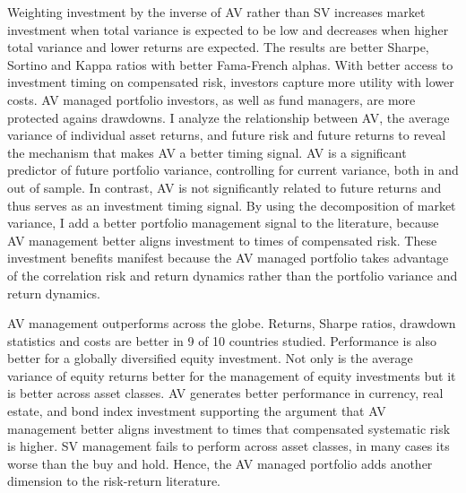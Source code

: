 Weighting investment by the inverse of AV rather than SV increases market investment when total variance is expected to be low and decreases when higher total variance and lower returns are expected. The results are better Sharpe, Sortino and Kappa ratios with better Fama-French alphas. With better access to investment timing on compensated risk, investors capture more utility with lower costs. AV managed portfolio investors, as well as fund managers, are more protected agains drawdowns. I analyze the relationship between AV, the average variance of individual asset returns, and future risk and future returns to reveal the mechanism that makes AV a better timing signal. AV is a significant predictor of future portfolio variance, controlling for current variance, both in and out of sample. In contrast, AV is not significantly related to future returns and thus serves as an investment timing signal. By using the decomposition of market variance, I add a better portfolio management signal to the literature, because AV management better aligns investment to times of compensated risk. These investment benefits manifest because the AV managed portfolio takes advantage of the correlation risk and return dynamics rather than the portfolio variance and return dynamics.

AV management outperforms across the globe. Returns, Sharpe ratios, drawdown statistics and costs are better in 9 of 10 countries studied. Performance is also better for a globally diversified equity investment. Not only is the average variance of equity returns better for the management of equity investments but it is better across asset classes. AV generates better performance in currency, real estate, and bond index investment supporting the argument that AV management better aligns investment to times that compensated systematic risk is higher. SV management fails to perform across asset classes, in many cases its worse than the buy and hold. Hence, the AV managed portfolio adds another dimension to the risk-return literature.


